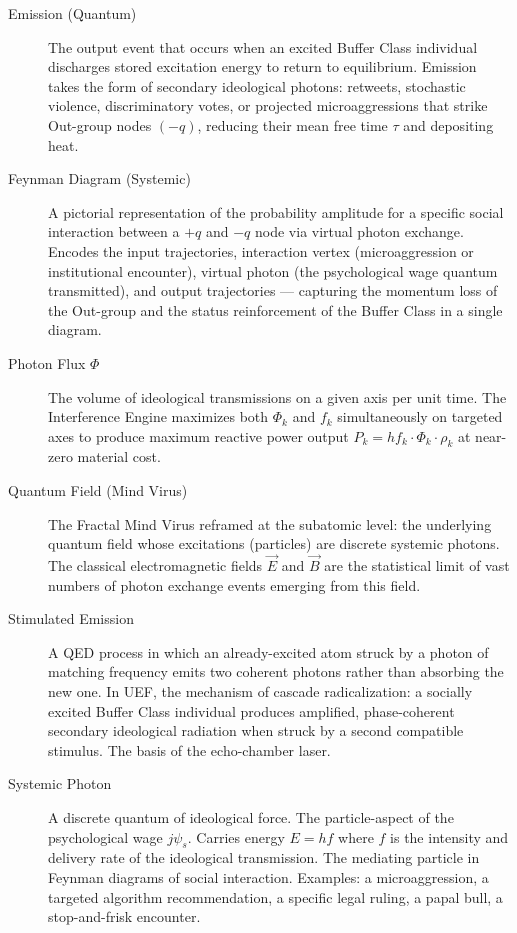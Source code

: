 \documentclass[12pt]{book}
\numberwithin{equation}{chapter}
\begin{document}
\begin{description}
\item[Emission (Quantum)] 
The output event that occurs when an excited Buffer Class individual discharges stored excitation energy to return to equilibrium. Emission takes the form of secondary ideological photons: retweets, stochastic violence, discriminatory votes, or projected microaggressions that strike Out-group nodes $(-q)$, reducing their mean free time $\tau$ and depositing heat.

\item[Feynman Diagram (Systemic)] 
A pictorial representation of the probability amplitude for a specific social interaction between a $+q$ and $-q$ node via virtual photon exchange. Encodes the input trajectories, interaction vertex (microaggression or institutional encounter), virtual photon (the psychological wage quantum transmitted), and output trajectories — capturing the momentum loss of the Out-group and the status reinforcement of the Buffer Class in a single diagram.

\item[Photon Flux $\Phi$] 
The volume of ideological transmissions on a given axis per unit time. The Interference Engine maximizes both $\Phi_k$ and $f_k$ simultaneously on targeted axes to produce maximum reactive power output $P_k = hf_k \cdot \Phi_k \cdot \rho_k$ at near-zero material cost.

\item[Quantum Field (Mind Virus)] 
The Fractal Mind Virus reframed at the subatomic level: the underlying quantum field whose excitations (particles) are discrete systemic photons. The classical electromagnetic fields $\vec{E}$ and $\vec{B}$ are the statistical limit of vast numbers of photon exchange events emerging from this field.

\item[Stimulated Emission] 
A QED process in which an already-excited atom struck by a photon of matching frequency emits two coherent photons rather than absorbing the new one. In UEF, the mechanism of cascade radicalization: a socially excited Buffer Class individual produces amplified, phase-coherent secondary ideological radiation when struck by a second compatible stimulus. The basis of the echo-chamber laser.

\item[Systemic Photon] 
A discrete quantum of ideological force. The particle-aspect of the psychological wage $j\psi_s$. Carries energy $E = hf$ where $f$ is the intensity and delivery rate of the ideological transmission. The mediating particle in Feynman diagrams of social interaction. Examples: a microaggression, a targeted algorithm recommendation, a specific legal ruling, a papal bull, a stop-and-frisk encounter.


\end{description}
\end{document}
